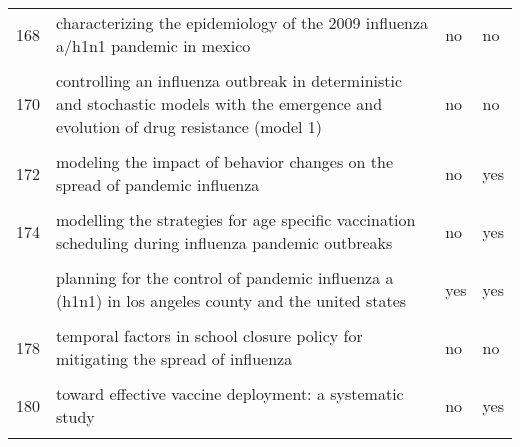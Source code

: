 \documentclass[
]{article}
\begin{document}
\begin{landscape}
\begin{longtable}{l>{\raggedright\arraybackslash}p{4cm}l>{\raggedright\arraybackslash}p{4cm}}
168 & characterizing the epidemiology of the 2009 influenza a/h1n1 pandemic in mexico & no & no\\
\cellcolor{gray!6}{169} & \cellcolor{gray!6}{cholera epidemic in haiti, 2010: using a transmission model to explain spatial spread of disease and identify optimal control interventions} & \cellcolor{gray!6}{no} & \cellcolor{gray!6}{yes}\\
170 & controlling an influenza outbreak in deterministic and stochastic models with the emergence and evolution of drug resistance (model 1) & no & no\\
\addlinespace
\cellcolor{gray!6}{171} & \cellcolor{gray!6}{modeling control strategies for concurrent epidemics of seasonal and pandemic h1n1 influenza} & \cellcolor{gray!6}{no} & \cellcolor{gray!6}{no}\\
172 & modeling the impact of behavior changes on the spread of pandemic influenza & no & yes\\
\cellcolor{gray!6}{173} & \cellcolor{gray!6}{modelling and analysis of influenza a (h1n1) on networks} & \cellcolor{gray!6}{no} & \cellcolor{gray!6}{yes}\\
174 & modelling the strategies for age specific vaccination scheduling during influenza pandemic outbreaks & no & yes\\
\cellcolor{gray!6}{175} & \cellcolor{gray!6}{modelling the transmission dynamics and control of the novel 2009 swine influenza (h1n1) pandemic} & \cellcolor{gray!6}{no} & \cellcolor{gray!6}{yes}\\
\addlinespace
176 & planning for the control of pandemic influenza a (h1n1) in los angeles county and the united states & yes & yes\\
\cellcolor{gray!6}{177} & \cellcolor{gray!6}{prioritization of delayed vaccination for pandemic influenza} & \cellcolor{gray!6}{no} & \cellcolor{gray!6}{yes}\\
178 & temporal factors in school closure policy for mitigating the spread of influenza & no & no\\
\cellcolor{gray!6}{179} & \cellcolor{gray!6}{the global transmission and control of influenza} & \cellcolor{gray!6}{yes} & \cellcolor{gray!6}{yes}\\
180 & toward effective vaccine deployment: a systematic study & no & yes\\
\addlinespace
\cellcolor{gray!6}{181} & \cellcolor{gray!6}{vaccination against 2009 pandemic h1n1 in a population dynamical model of vancouver, canada: timing is everything} & \cellcolor{gray!6}{no} & \cellcolor{gray!6}{yes}\\

\end{longtable}
\end{landscape}
\end{document}
